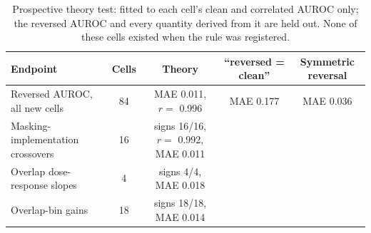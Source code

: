 \begin{table}[H]\centering\scriptsize
\caption{Prospective theory test: fitted to each cell's clean and correlated AUROC only; the reversed AUROC and every quantity derived from it are held out. None of these cells existed when the rule was registered.}\label{tab:s16r11}
\begin{tabular}{lcccc}\toprule
Endpoint & Cells & Theory & ``reversed = clean'' & Symmetric reversal \\\midrule
Reversed AUROC, all new cells & 84 & MAE 0.011, $r=$ 0.996 & MAE 0.177 & MAE 0.036 \\
Masking-implementation crossovers & 16 & signs 16/16, $r=$ 0.992, MAE 0.011 &  &  \\
Overlap dose-response slopes & 4 & signs 4/4, MAE 0.018 &  &  \\
Overlap-bin gains & 18 & signs 18/18, MAE 0.014 &  &  \\
\bottomrule\end{tabular}
\end{table}
